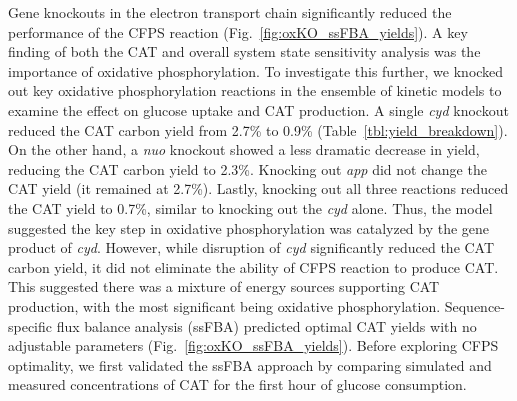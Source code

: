 \documentclass[12pt]{article}
\begin{document}
Gene knockouts in the electron transport chain significantly reduced the performance of the CFPS reaction (Fig.~\ref{fig:oxKO_ssFBA_yields}).
A key finding of both the CAT and overall system state sensitivity analysis was the importance of oxidative phosphorylation.
To investigate this further, we knocked out key oxidative phosphorylation reactions in the ensemble of kinetic models to examine the effect on glucose uptake and CAT production.
A single \textit{cyd} knockout reduced the CAT carbon yield from 2.7\% to 0.9\% (Table~\ref{tbl:yield_breakdown}).
On the other hand, a \textit{nuo} knockout showed a less dramatic decrease in yield,
reducing the CAT carbon yield to 2.3\%.
Knocking out \textit{app} did not change the CAT yield (it remained at 2.7\%).
Lastly, knocking out all three reactions reduced the CAT yield to 0.7\%, similar to knocking out the \textit{cyd} alone.
Thus, the model suggested the key step in oxidative phosphorylation was catalyzed by the gene product of \textit{cyd}.
However, while disruption of \textit{cyd} significantly reduced the CAT carbon yield, it did not eliminate the ability of CFPS reaction to produce CAT.
This suggested there was a mixture of energy sources supporting CAT production, with the most significant being oxidative phosphorylation.
Sequence-specific flux balance analysis (ssFBA) predicted optimal CAT yields with no adjustable parameters (Fig.~\ref{fig:oxKO_ssFBA_yields}).
Before exploring CFPS optimality, we first validated the ssFBA approach by comparing simulated and measured concentrations of CAT for the first hour of glucose consumption.
\end{document}
